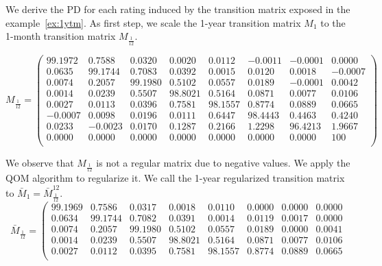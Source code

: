 \documentclass[11pt,fleqn]{book} %
\begin{document}
\begin{example}
	\label{ex:pdftm}
	We derive the PD for each rating induced by the transition matrix exposed
	in the example~\ref{ex:1ytm}. As first step, we scale the 1-year transition 
	matrix $M_1$ to the 1-month transition matrix $M_{\frac{1}{12}}$.
	{\small
	\begin{displaymath}
		M_{\frac{1}{12}} = \left(
		\begin{array}{cccccccc}
			99.1972 &  0.7588 &  0.0320 &  0.0020 &  0.0112 & -0.0011 & -0.0001 &   0.0000 \\
			 0.0635 & 99.1744 &  0.7083 &  0.0392 &  0.0015 &  0.0120 &  0.0018 &  -0.0007 \\
			 0.0074 &  0.2057 & 99.1980 &  0.5102 &  0.0557 &  0.0189 & -0.0001 &   0.0042 \\
			 0.0014 &  0.0239 &  0.5507 & 98.8021 &  0.5164 &  0.0871 &  0.0077 &   0.0106 \\
			 0.0027 &  0.0113 &  0.0396 &  0.7581 & 98.1557 &  0.8774 &  0.0889 &   0.0665 \\
			-0.0007 &  0.0098 &  0.0196 &  0.0111 &  0.6447 & 98.4443 &  0.4463 &   0.4240 \\
			 0.0233 & -0.0023 &  0.0170 &  0.1287 &  0.2166 &  1.2298 & 96.4213 &   1.9667 \\
			 0.0000 &  0.0000 &  0.0000 &  0.0000 &  0.0000 &  0.0000 &  0.0000 & 100 \\
		\end{array}
		\right)
	\end{displaymath}\par}
	We observe that $M_{\frac{1}{12}}$ is not a regular matrix due to negative
	values. We apply the QOM algorithm to regularize it. We call the 1-year 
	regularized transition matrix to $\bar{M}_1 = \bar{M}_{\frac{1}{12}}^{12}$.
	{\small
	\begin{displaymath}
		\bar{M}_{\frac{1}{12}} = \left(
		\begin{array}{cccccccc}
			99.1969 &  0.7586 &  0.0317 &  0.0018 &  0.0110 &  0.0000 &  0.0000 &   0.0000 \\
			 0.0634 & 99.1744 &  0.7082 &  0.0391 &  0.0014 &  0.0119 &  0.0017 &   0.0000 \\
			 0.0074 &  0.2057 & 99.1980 &  0.5102 &  0.0557 &  0.0189 &  0.0000 &   0.0041 \\
			 0.0014 &  0.0239 &  0.5507 & 98.8021 &  0.5164 &  0.0871 &  0.0077 &   0.0106 \\
			 0.0027 &  0.0112 &  0.0395 &  0.7581 & 98.1557 &  0.8774 &  0.0889 &   0.0665 \\

\end{array}
\end{displaymath}}
\end{example}
\end{document}
